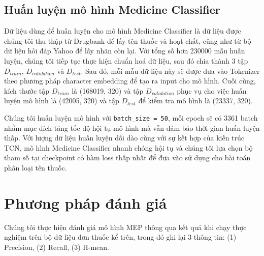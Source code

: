 \subsection{Huấn luyện mô hình Medicine Classifier}

Dữ liệu dùng để huấn luyện cho mô hình Medicine Classifier là dữ liệu được chúng tôi thu thập từ Drugbank để lấy tên thuốc và hoạt chất, cũng như từ bộ dữ liệu hỏi đáp Yahoo để lấy nhãn còn lại. Với tổng số hơn 230000 mẫu huấn luyện, chúng tôi tiếp tục thực hiện chuẩn hoá dữ liệu, sau đó chia thành 3 tập $D_{train}$, $D_{validation}$ và $D_{test}$. Sau đó, mỗi mẫu dữ liệu này sẽ được đưa vào Tokenizer theo phương pháp character embedding để tạo ra input cho mô hình. Cuối cùng, kích thước tập $D_{train}$ là (168019, 320) và tập $D_{validation}$ phục vụ cho việc huấn luyện mô hình là (42005, 320) và tập $D_{test}$ để kiểm tra mô hình là (23337, 320).

Chúng tôi huấn luyện mô hình với \verb|batch_size = 50|, mỗi epoch sẽ có 3361 batch nhằm mục đích tăng tốc độ hội tụ mô hình mà vẫn đảm bảo thời gian huấn luyện thấp. Với lượng dữ liệu huấn luyện dồi dào cùng với sự kết hợp của kiến trúc TCN, mô hình Medicine Classifier nhanh chóng hội tụ và chúng tôi lựa chọn bộ tham số tại checkpoint có hàm loss thấp nhất để đưa vào sử dụng cho bài toán phân loại tên thuốc.

\section{Phương pháp đánh giá}

Chúng tôi thực hiện đánh giá mô hình MEP thông qua kết quả khi chạy thực nghiệm trên bộ dữ liệu đơn thuốc kể trên, trong đó ghi lại 3 thông tin: (1) Precision, (2) Recall, (3) H-mean.

